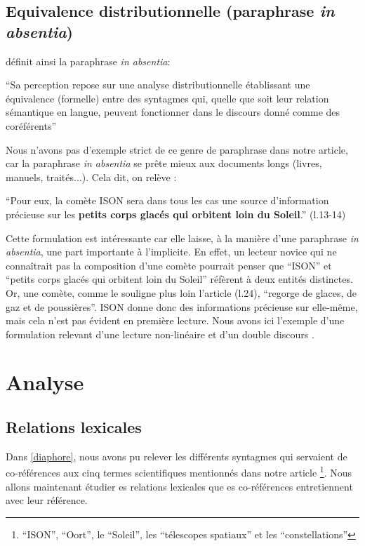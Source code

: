 \documentclass[a4paper,10pt]{article}
\begin{document}
	\subsection{Equivalence distributionnelle (paraphrase \textit{in absentia})}
		\cite{Mortureux1993} définit ainsi la paraphrase \textit{in absentia}:
		\begin{center}
			\footnotesize
			\begin{minipage}{0.7\textwidth}
				``Sa perception repose sur une analyse distributionnelle établissant une équivalence (formelle) entre des syntagmes qui, quelle que soit leur relation sémantique en langue, peuvent fonctionner dans le discours donné comme des coréférents''
			\end{minipage}
		\end{center}
		Nous n'avons pas d'exemple strict de ce genre de paraphrase dans notre article, car la paraphrase \textit{in absentia} se prête mieux aux documents longs (livres, manuels, traités...). Cela dit, on relève :
		\begin{center}
			\footnotesize
			\begin{minipage}{0.7\textwidth}
				``Pour eux, la comète ISON sera dans tous les cas une source d'information précieuse sur les \textbf{petits corps glacés qui orbitent loin du Soleil}.'' (l.13-14)
			\end{minipage}
		\end{center}
		Cette formulation est intéressante car elle laisse, à la manière d'une paraphrase \textit{in absentia}, une part importante à l'implicite. En effet, un lecteur novice qui ne connaîtrait pas la composition d'une comète pourrait penser que ``ISON'' et ``petits corps glacés qui orbitent loin du Soleil'' réfèrent à deux entités distinctes. Or, une comète, comme le souligne plus loin l'article (l.24), ``regorge de glaces, de gaz et de poussières''. ISON donne donc des informations précieuse sur elle-même, mais cela n'est pas évident en première lecture. Nous avons ici l'exemple d'une formulation relevant d'une lecture non-linéaire et d'un double discours \cite{Mortureux1984}.
		
\section{Analyse}
	\subsection{Relations lexicales}
		Dans \ref{diaphore}, nous avons pu relever les différents syntagmes qui servaient de co-références aux cinq termes scientifiques mentionnés dans notre article \footnote{``ISON'', ``Oort'', le ``Soleil'', les ``télescopes spatiaux'' et les ``constellations''}. Nous allons maintenant étudier es relations lexicales que es co-références entretiennent avec leur référence.
\end{document}
